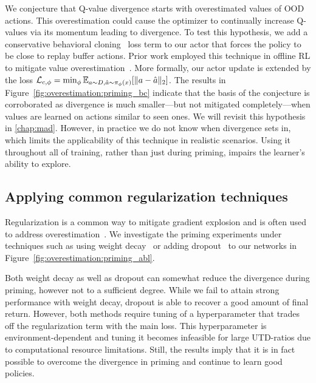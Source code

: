 We conjecture that Q-value divergence starts with overestimated values of OOD actions. This overestimation could cause the optimizer to continually increase Q-values via its momentum leading to divergence. 
To test this hypothesis, we add a conservative behavioral cloning~\parencite{pomerleau1988alvinn, atkeson1997robot} loss term to our actor that forces the policy to be close to replay buffer actions. Prior work employed this technique in offline RL to mitigate value overestimation~\parencite{fujimoto2021td3bc}. More formally, our actor update is extended by the loss $
        \mathcal{L}_{c, \phi} = \min_{\phi} \mathbb{E}_{a \sim D, \hat{a} \sim \pi_{\phi}(x)}[\|a - \hat{a}\|_2]$. 
The results in Figure~\ref{fig:overestimation:priming_bc} indicate that the basis of the conjecture is corroborated as divergence is much smaller---but not mitigated completely---when values are learned on actions similar to seen ones.
We will revisit this hypothesis in \autoref{chap:mad}.
However, in practice we do not know when divergence sets in, which limits the applicability of this technique in realistic scenarios. Using it throughout all of training, rather than just during priming, impairs the learner's ability to explore.




\subsection{Applying common regularization techniques} \label{sec:regularization}

Regularization is a common way to mitigate gradient explosion and is  often used to address overestimation~\parencite{farebrother2018generalization, chen2021randomized, liu2021regularization, hiraoka2022dropout, li2023efficient}. We investigate the priming experiments under techniques such as using weight decay~\parencite{krogh1991simple} or adding dropout~\parencite{srivastava14dropout} to our networks in Figure~\ref{fig:overestimation:priming_abl}.

Both weight decay as well as dropout can somewhat reduce the divergence during priming, however not to a sufficient degree.
While we fail to attain strong performance with weight decay, dropout is able to recover a good amount of final return.
However, both methods require tuning of a hyperparameter that trades off the regularization term with the main loss.
This hyperparameter is environment-dependent and tuning it becomes infeasible for large UTD-ratios due to computational resource limitations. 
Still, the results imply that it is in fact possible to overcome the divergence in priming and continue to learn good policies.





